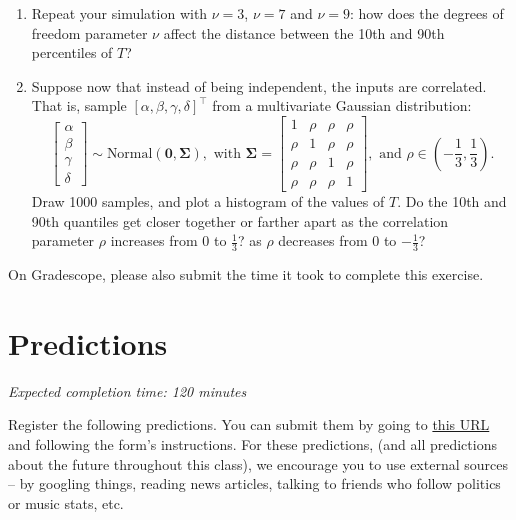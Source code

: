 \documentclass[11pt]{article}
\begin{document}
\begin{enumerate}
	\item Repeat your simulation with $\nu = 3$, $\nu = 7$ and $\nu = 9$: how does the degrees of freedom parameter $\nu$ affect the distance between the 10th and 90th percentiles of $T$?
	\item Suppose now that instead of being independent, the inputs are correlated. That is, sample $[\alpha, \beta, \gamma, \delta]^\top$ from a multivariate Gaussian distribution: 
		$$
		\begin{bmatrix}
			\alpha\\
			\beta\\
			\gamma\\
			\delta	
		\end{bmatrix} \sim \text{Normal}(\mathbf{0}, \mathbf{\Sigma}),
		\text{ with }
		\mathbf{\Sigma} = \begin{bmatrix}
				1 & \rho & \rho & \rho\\
				\rho & 1 & \rho & \rho\\
				\rho & \rho & 1 & \rho\\
				\rho & \rho & \rho & 1
			\end{bmatrix},
		\text{ and } \rho \in \left(-\frac 1 3, \frac 1 3\right).
		$$
	Draw 1000 samples, and plot a histogram of the values of $T$. Do the 10th and 90th quantiles get closer together or farther apart as the correlation parameter $\rho$ increases from 0 to $\frac 1 3$? as $\rho$ decreases from 0 to $- \frac 1 3$?
\end{enumerate}


On Gradescope, please also submit the time it took to complete this exercise.

\section*{Predictions}

\emph{Expected completion time: 120 minutes} 

Register the following predictions. You can submit them by going to \href{https://docs.google.com/forms/d/1zfza4lPpQWRJDRBghY6a9-HK3erBo32wJBQy-BGfhBA/edit}{this URL} and following the form's instructions. For these predictions, (and all predictions about the future throughout this class), we encourage you to use external sources -- by googling things, reading news articles, talking to friends who follow politics or music stats, etc.
\end{document}
